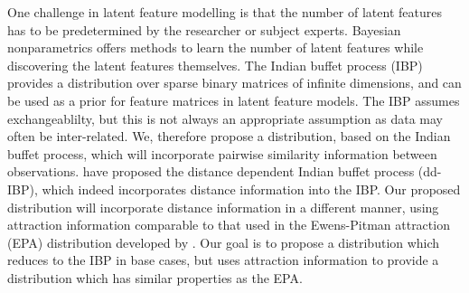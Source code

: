 One challenge in latent feature modelling is that the number of latent features has to be predetermined by the researcher or subject experts. Bayesian nonparametrics offers methods to learn the number of latent features while discovering the latent features themselves. The Indian buffet process (IBP) provides a distribution over sparse binary matrices of infinite dimensions, and can be used as a prior for feature matrices in latent feature models.  The IBP assumes exchangeablilty, but this is not always an appropriate assumption as data may often be inter-related. We, therefore propose a distribution, based on the Indian buffet process, which will incorporate pairwise similarity information between observations. \cite{ddibp} have proposed the distance dependent Indian buffet process (dd-IBP), which indeed incorporates distance information into the IBP. Our proposed distribution will incorporate distance information in a different manner, using attraction information comparable to that used in the Ewens-Pitman attraction (EPA) distribution developed by \cite{epa}. Our goal is to propose a distribution which reduces to the IBP in base cases, but uses attraction information to provide a distribution which has similar properties as the EPA.
